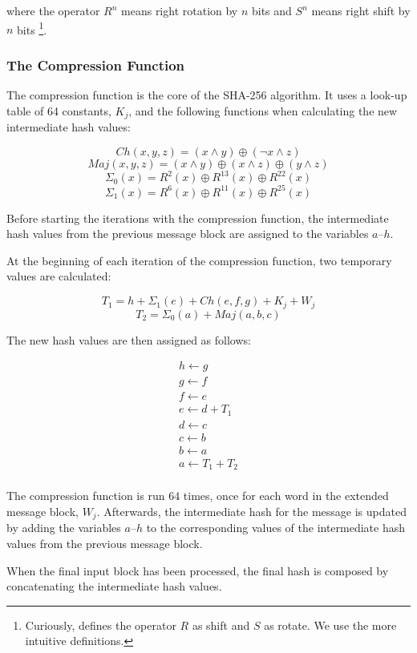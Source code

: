 \begin{appendix}
\noindent where the operator $R^n$ means right rotation by $n$ bits and $S^n$ means right shift by $n$
bits \footnote{Curiously, \cite{sha-spec} defines the operator $R$ as shift and $S$ as rotate.
We use the more intuitive definitions.}.

\subsubsection{The Compression Function}
\label{sec:sha-compr}
The compression function is the core of the SHA-256 algorithm. It uses a look-up table
of 64 constants, $K_j$, and the following functions when calculating the new intermediate
hash values:

\[Ch(x,y,z) = (x \wedge y) \oplus (\neg x \wedge z)\]
\[Maj(x, y, z) = (x \wedge y) \oplus (x \wedge z) \oplus (y \wedge z)\]
\[\Sigma_0(x) = R^2(x) \oplus R^{13}(x) \oplus R^{22}(x)\]
\[\Sigma_1(x) = R^6(x) \oplus R^{11}(x) \oplus R^{25}(x)\]

Before starting the iterations with the compression function, the intermediate
hash values from the previous message block are assigned to the variables $a$--$h$.

At the beginning of each iteration of the compression function, two temporary
values are calculated:

\[T_1 = h + \Sigma_1(e) + Ch(e, f, g) + K_j + W_j\]
\[T_2 = \Sigma_0(a) + Maj(a, b, c)\]

The new hash values are then assigned as follows:

\[\begin{array}{l}
	h \leftarrow g \\
	g \leftarrow f \\
	f \leftarrow e \\
	e \leftarrow d + T_1\\
	d \leftarrow c \\
	c \leftarrow b \\
	b \leftarrow a \\
	a \leftarrow T_1 + T_2 \\
\end{array}\]

The compression function is run 64 times, once for each word in the extended message block,
$W_j$. Afterwards, the intermediate hash for the message is updated by adding the
variables $a$--$h$ to the corresponding values of the intermediate hash values from
the previous message block.

When the final input block has been processed, the final hash is composed by
concatenating the intermediate hash values. \cite{sha-spec, fips180-4, fordypningsprosjekt}


\end{appendix}
